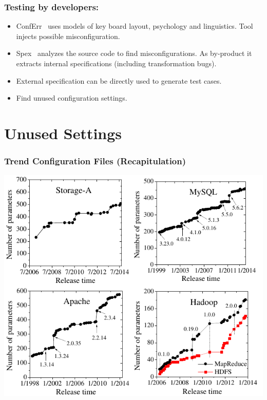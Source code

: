 \begin{frame}
	\frametitle{Testing by developers:}
	\begin{itemize}[<+-| alert@+>]
	\item ConfErr~\cite{keller2008conferr} uses models of key board layout, psychology and linguistics.
	Tool injects possible misconfiguration.
	\item Spex~\cite{xu2013blame} analyzes the source code to find misconfigurations.
	As by-product it extracts internal specifications (including transformation bugs).
	\item External specification can be directly used to generate test cases.
	\item Find unused configuration settings.
	\end{itemize}
\end{frame}

\section{Unused Settings}

\begin{frame}
	\frametitle{Trend Configuration Files (Recapitulation)}
	\includegraphics[scale=0.5]{pics/trend.png}
	\citet{xu2015hey}
\end{frame}

